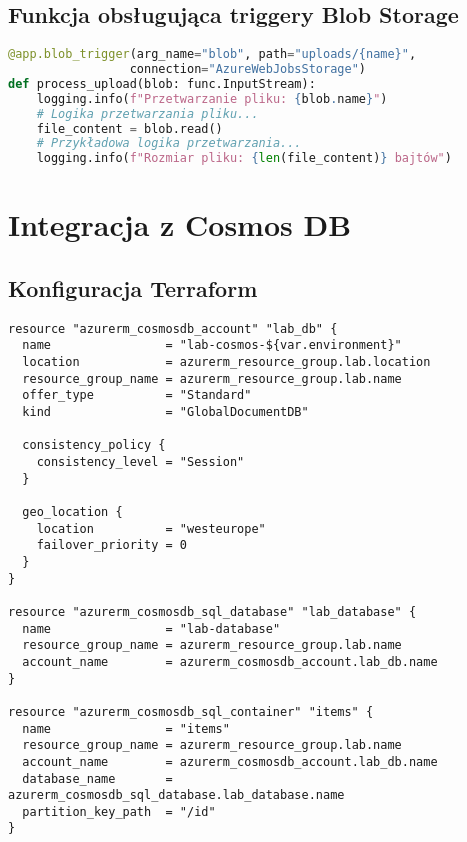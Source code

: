 \documentclass{article}
\begin{document}
\subsection{Funkcja obsługująca triggery Blob Storage}
\begin{lstlisting}[language=python]
@app.blob_trigger(arg_name="blob", path="uploads/{name}", 
                 connection="AzureWebJobsStorage")
def process_upload(blob: func.InputStream):
    logging.info(f"Przetwarzanie pliku: {blob.name}")
    # Logika przetwarzania pliku...
    file_content = blob.read()
    # Przykładowa logika przetwarzania...
    logging.info(f"Rozmiar pliku: {len(file_content)} bajtów")
\end{lstlisting}

\section{Integracja z Cosmos DB}
\subsection{Konfiguracja Terraform}
\begin{lstlisting}[]
resource "azurerm_cosmosdb_account" "lab_db" {
  name                = "lab-cosmos-${var.environment}"
  location            = azurerm_resource_group.lab.location
  resource_group_name = azurerm_resource_group.lab.name
  offer_type          = "Standard"
  kind                = "GlobalDocumentDB"

  consistency_policy {
    consistency_level = "Session"
  }

  geo_location {
    location          = "westeurope"
    failover_priority = 0
  }
}

resource "azurerm_cosmosdb_sql_database" "lab_database" {
  name                = "lab-database"
  resource_group_name = azurerm_resource_group.lab.name
  account_name        = azurerm_cosmosdb_account.lab_db.name
}

resource "azurerm_cosmosdb_sql_container" "items" {
  name                = "items"
  resource_group_name = azurerm_resource_group.lab.name
  account_name        = azurerm_cosmosdb_account.lab_db.name
  database_name       = azurerm_cosmosdb_sql_database.lab_database.name
  partition_key_path  = "/id"
}
\end{lstlisting}
\end{document}
